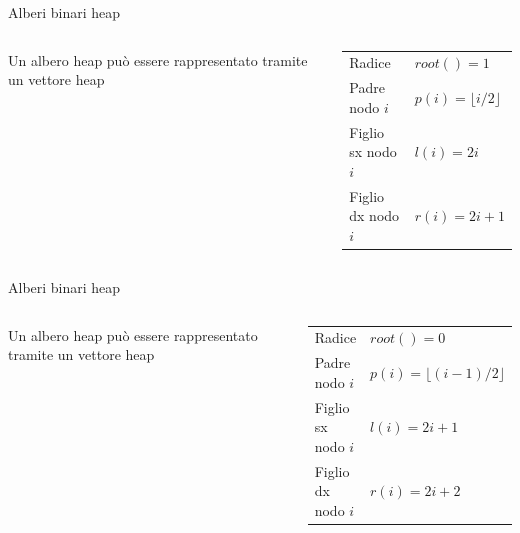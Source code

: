 \begin{frame}{Alberi binari heap}

\vspace{-12pt}
\small
\begin{columns}[T]
\begin{myboxtitle}
Un albero heap può essere rappresentato tramite un \alert{vettore heap} 
\end{myboxtitle}

\begin{myboxtitle}
  \renewcommand*{\arraystretch}{1.2}
  \begin{tabular}{ll}
    \alert{Radice} & $root() = 1$\\
    \alert{Padre nodo $i$} & $p(i) = \lfloor i/2 \rfloor$\\
    \alert{Figlio sx nodo $i$} & $l(i) = 2i$\\
    \alert{Figlio dx nodo $i$} & $r(i) = 2i+1$\\
  \end{tabular}
\end{myboxtitle}

\vspace{-12pt}
\end{columns}



\end{frame}

\begin{frame}{Alberi binari heap}

\vspace{-12pt}
\small
\begin{columns}[T]
\begin{myboxtitle}
Un albero heap può essere rappresentato tramite un \alert{vettore heap} 
\end{myboxtitle}

\begin{myboxtitle}
  \renewcommand*{\arraystretch}{1.2}
  \begin{tabular}{ll}
    \alert{Radice} & $root() = 0$\\
    \alert{Padre nodo $i$} & $p(i) = \lfloor (i-1)/2 \rfloor$\\
    \alert{Figlio sx nodo $i$} & $l(i) = 2i+1$\\
    \alert{Figlio dx nodo $i$} & $r(i) = 2i+2$\\
  \end{tabular}
\end{myboxtitle}
\vspace{-12pt}
\end{columns}


\end{frame}

